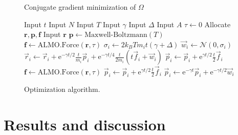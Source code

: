 \documentclass[aps,prl,reprint,amsmath,amssymb]{revtex4-1}
\begin{document}
\begin{figure}
\begin{algorithm}[H]
  \caption{Conjugate gradient minimization of $\Omega$}
  \label{alg:cg}
   \begin{algorithmic}[1]
   	\State Input $t$ 
   	\State Input $N$ 
   	\State Input $T$ 
   	\State Input $\gamma$ 
   	\State Input $\Delta$  \label{line:delta1}
   	\State Input $A$ 
	\State $\tau\gets 0$ 
	\State Allocate $\mathbf{r}, \mathbf{p}, \mathbf{f}$ 
   	\State Input $\mathbf{r}$
	\State $\mathbf{p} \gets \text{Maxwell-Boltzmann}(T)$ 
	\State $\mathbf{f} \gets \text{ALMO.Force}(\mathbf{r},\tau)$ 
	 
		 
			\State $\sigma_i \gets 2 k_B T m_i t (\gamma + \Delta)$  \label{line:delta2}
			\State $\vec{w}_{i} \gets \mathcal{N}(0,\sigma_i)$ 
			\State $\vec{r}_i \gets \vec{r}_i + \mathrm{e}^{-\gamma t/2} \frac{t}{m_i}\vec{p}_i + \mathrm{e}^{-\gamma t/4} \frac{t}{2 m_i} \left( t \vec{f}_i + \vec{w}_i \right) $
			\State $\vec{p}_i \gets \vec{p}_i + \mathrm{e}^{\gamma t/2} \frac{t}{2} \vec{f}_i$ 
		\EndFor
		\State $\mathbf{f} \gets \text{ALMO.Force}(\mathbf{r},\tau)$ 
			\State $\vec{p}_i \gets \vec{p}_i + \mathrm{e}^{\gamma t/2} \frac{t}{2} \vec{f}_i $
			\State $\vec{p}_i \gets \mathrm{e}^{-\gamma t} \vec{p}_i + \mathrm{e}^{-\gamma t/2} \vec{w}_i $   
		\EndFor
	\EndFor
   \end{algorithmic}
\end{algorithm}
\caption{\label{fig:cg} Optimization algorithm.}
\end{figure}


\section{Results and discussion}
\end{document}
